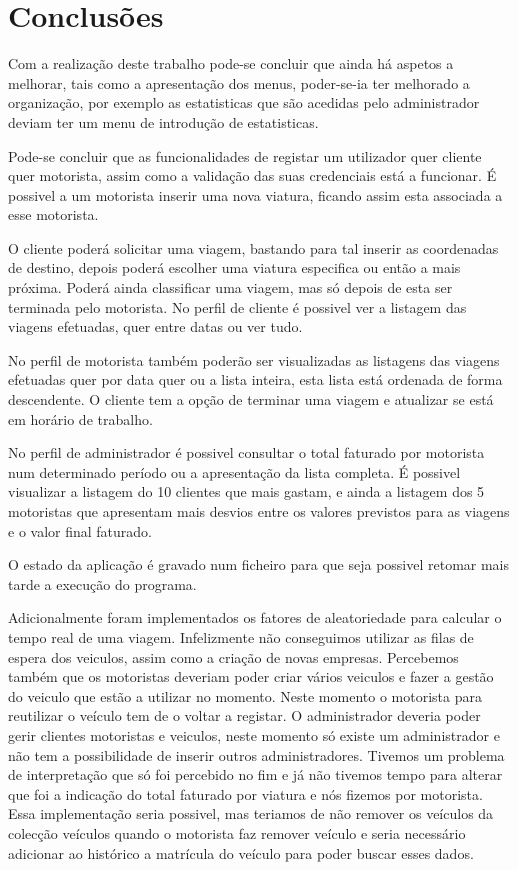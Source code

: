 \chapter{Conclusões }

Com a realização deste trabalho pode-se concluir que ainda há aspetos a melhorar, tais como a apresentação dos menus, poder-se-ia ter melhorado a organização, por exemplo as estatisticas que são acedidas pelo administrador deviam ter um menu de introdução de estatisticas. 

Pode-se concluir que as funcionalidades de registar um utilizador quer cliente quer motorista, assim como a validação das suas credenciais está a funcionar. É possivel a um motorista inserir uma nova viatura, ficando assim esta associada a esse motorista. 

O cliente poderá solicitar uma viagem, bastando para tal inserir as coordenadas de destino, depois poderá escolher uma viatura especifica ou então a mais próxima. Poderá ainda classificar uma viagem, mas só depois de esta ser terminada pelo motorista. No perfil de cliente é possivel ver a listagem das viagens efetuadas, quer entre datas ou ver tudo. 

No perfil de motorista também poderão ser visualizadas as listagens das viagens efetuadas quer por data quer ou a lista inteira, esta lista está ordenada de forma descendente. O cliente tem a opção de terminar uma viagem e atualizar se está em horário de trabalho. 

No perfil de administrador é possivel consultar o total faturado por motorista num determinado período ou a apresentação da lista completa. É possivel visualizar a listagem do 10 clientes que mais gastam, e ainda a listagem dos 5 motoristas que apresentam mais desvios entre os valores previstos para as viagens e o valor final faturado. 

O estado da aplicação é gravado num ficheiro para que seja possivel retomar mais tarde a execução do programa. 

Adicionalmente foram implementados os fatores de aleatoriedade  para calcular o tempo real de uma viagem. 
Infelizmente não conseguimos utilizar as filas de espera dos veiculos, assim como a criação de novas empresas. Percebemos também que os motoristas deveriam poder criar vários veiculos e fazer a gestão do veiculo que estão a utilizar no momento. Neste momento o motorista para reutilizar o veículo tem de o voltar a registar.  O administrador deveria poder gerir clientes motoristas e veiculos, neste momento só existe um administrador e não tem a possibilidade de inserir outros administradores. Tivemos um problema de interpretação que só foi percebido no fim e já não tivemos tempo para alterar que foi a indicação do total faturado por viatura e nós fizemos por motorista. Essa implementação seria possivel, mas teriamos de não remover os veículos da colecção veículos  quando o motorista faz remover veículo e seria necessário adicionar ao histórico a matrícula do veículo para poder buscar esses dados. 


